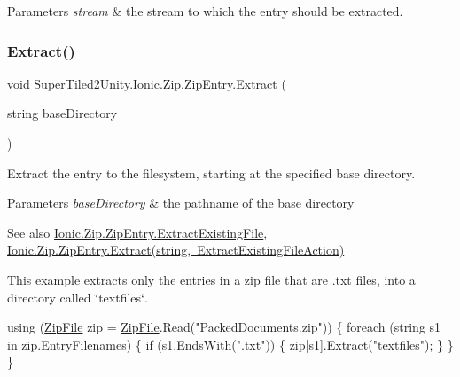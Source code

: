 \begin{DoxyParams}{Parameters}
{\em stream} & the stream to which the entry should be extracted. \\
\hline
\end{DoxyParams}
\mbox{\label{class_super_tiled2_unity_1_1_ionic_1_1_zip_1_1_zip_entry_a9620a0b7f21b2ae639d555d8f6a528d5}} 
\subsubsection{\texorpdfstring{Extract()}{Extract()}\hspace{0.1cm}{\footnotesize\ttfamily [4/5]}}
{\footnotesize\ttfamily void Super\+Tiled2\+Unity.\+Ionic.\+Zip.\+Zip\+Entry.\+Extract (\begin{DoxyParamCaption}\item[{string}]{base\+Directory }\end{DoxyParamCaption})}



Extract the entry to the filesystem, starting at the specified base directory. 


\begin{DoxyParams}{Parameters}
{\em base\+Directory} & the pathname of the base directory\\
\hline
\end{DoxyParams}


\begin{DoxySeeAlso}{See also}
\mbox{\hyperlink{class_super_tiled2_unity_1_1_ionic_1_1_zip_1_1_zip_entry_ad1ab903c29b91edb82e7c6a9768552dd}{Ionic.\+Zip.\+Zip\+Entry.\+Extract\+Existing\+File}}, \mbox{\hyperlink{class_super_tiled2_unity_1_1_ionic_1_1_zip_1_1_zip_entry_a704fdbf9a9838692b6fbf4fa2991cca8}{Ionic.\+Zip.\+Zip\+Entry.\+Extract(string, Extract\+Existing\+File\+Action)}}


\end{DoxySeeAlso}


This example extracts only the entries in a zip file that are .txt files, into a directory called \char`\"{}textfiles\char`\"{}. 
\begin{DoxyCode}
\textcolor{keyword}{using} (\mbox{\hyperlink{namespace_super_tiled2_unity_1_1_ionic_1_1_zip_a9ced5352c56e7e0fceff15b534073c83a088ad16b06174c69965e232063ba6d16}{ZipFile}} zip = \mbox{\hyperlink{namespace_super_tiled2_unity_1_1_ionic_1_1_zip_a9ced5352c56e7e0fceff15b534073c83a088ad16b06174c69965e232063ba6d16}{ZipFile}}.Read(\textcolor{stringliteral}{"PackedDocuments.zip"}))
\{
  \textcolor{keywordflow}{foreach} (\textcolor{keywordtype}{string} s1 \textcolor{keywordflow}{in} zip.EntryFilenames)
  \{
    \textcolor{keywordflow}{if} (s1.EndsWith(\textcolor{stringliteral}{".txt"}))
    \{
      zip[s1].Extract(\textcolor{stringliteral}{"textfiles"});
    \}
  \}
\}
\end{DoxyCode}
 

